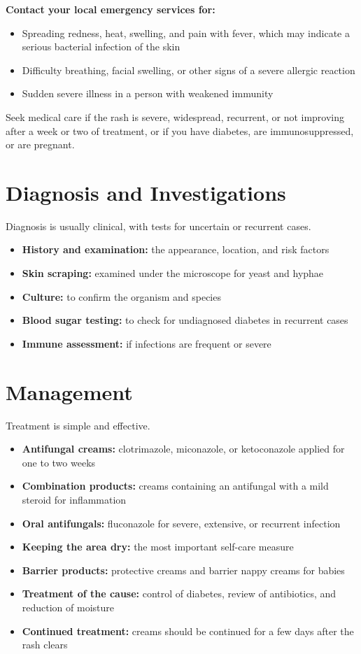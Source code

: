\textbf{Contact your local emergency services for:}
\begin{itemize}
    \item Spreading redness, heat, swelling, and pain with fever, which may indicate a serious bacterial infection of the skin
    \item Difficulty breathing, facial swelling, or other signs of a severe allergic reaction
    \item Sudden severe illness in a person with weakened immunity
\end{itemize}

Seek medical care if the rash is severe, widespread, recurrent, or not improving after a week or two of treatment, or if you have diabetes, are immunosuppressed, or are pregnant.

\section*{Diagnosis and Investigations}
Diagnosis is usually clinical, with tests for uncertain or recurrent cases.

\begin{itemize}
    \item \textbf{History and examination:} the appearance, location, and risk factors
    \item \textbf{Skin scraping:} examined under the microscope for yeast and hyphae
    \item \textbf{Culture:} to confirm the organism and species
    \item \textbf{Blood sugar testing:} to check for undiagnosed diabetes in recurrent cases
    \item \textbf{Immune assessment:} if infections are frequent or severe
\end{itemize}

\section*{Management}
Treatment is simple and effective.

\begin{itemize}
    \item \textbf{Antifungal creams:} clotrimazole, miconazole, or ketoconazole applied for one to two weeks
    \item \textbf{Combination products:} creams containing an antifungal with a mild steroid for inflammation
    \item \textbf{Oral antifungals:} fluconazole for severe, extensive, or recurrent infection
    \item \textbf{Keeping the area dry:} the most important self-care measure
    \item \textbf{Barrier products:} protective creams and barrier nappy creams for babies
    \item \textbf{Treatment of the cause:} control of diabetes, review of antibiotics, and reduction of moisture
    \item \textbf{Continued treatment:} creams should be continued for a few days after the rash clears
\end{itemize}

